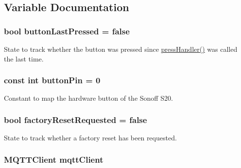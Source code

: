 \subsection{Variable Documentation}
\hypertarget{WIFIOnOff_8ino_a80700674ee3f9a7b6ae86b0756679902}{
\subsubsection[{button\-Last\-Pressed}]{\setlength{\rightskip}{0pt plus 5cm}bool button\-Last\-Pressed = false}}\label{WIFIOnOff_8ino_a80700674ee3f9a7b6ae86b0756679902}


State to track whether the button was pressed since \hyperlink{WIFIOnOff_8ino_acd4d58af93c899ee9a03131727b1cf34}{press\-Handler()} was called the last time. 

\hypertarget{WIFIOnOff_8ino_a4ddb8b6ae564eb22f7c74f2683a63b8e}{
\subsubsection[{button\-Pin}]{\setlength{\rightskip}{0pt plus 5cm}const int button\-Pin = 0}}\label{WIFIOnOff_8ino_a4ddb8b6ae564eb22f7c74f2683a63b8e}


Constant to map the hardware button of the Sonoff S20. 

\hypertarget{WIFIOnOff_8ino_a4768e99cded5c5493ba789b0555c80fc}{
\subsubsection[{factory\-Reset\-Requested}]{\setlength{\rightskip}{0pt plus 5cm}bool factory\-Reset\-Requested = false}}\label{WIFIOnOff_8ino_a4768e99cded5c5493ba789b0555c80fc}


State to track whether a factory reset has been requested. 

\hypertarget{WIFIOnOff_8ino_a0524591f2a058a4f26f16579245db356}{
\subsubsection[{mqtt\-Client}]{\setlength{\rightskip}{0pt plus 5cm}M\-Q\-T\-T\-Client mqtt\-Client}}\label{WIFIOnOff_8ino_a0524591f2a058a4f26f16579245db356}


